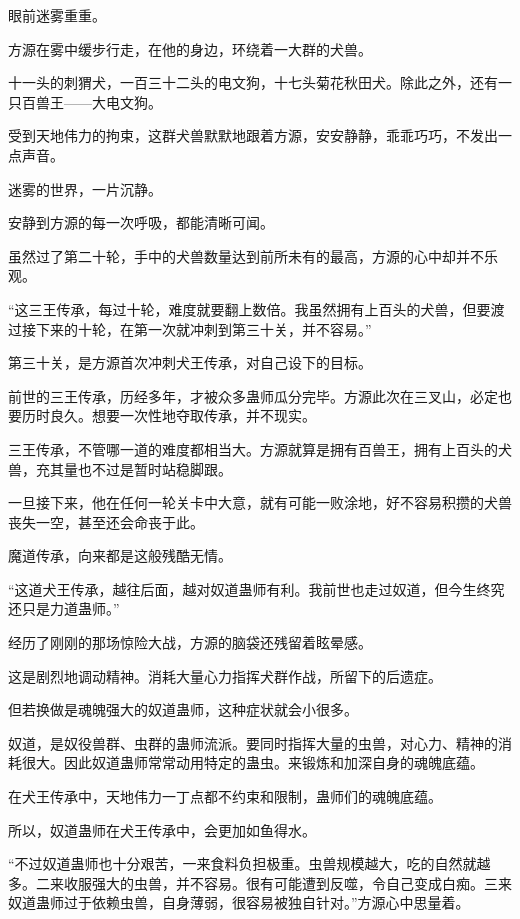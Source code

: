 
\begin{this_body}



眼前迷雾重重。

方源在雾中缓步行走，在他的身边，环绕着一大群的犬兽。

十一头的刺猬犬，一百三十二头的电文狗，十七头菊花秋田犬。除此之外，还有一只百兽王——大电文狗。

受到天地伟力的拘束，这群犬兽默默地跟着方源，安安静静，乖乖巧巧，不发出一点声音。

迷雾的世界，一片沉静。

安静到方源的每一次呼吸，都能清晰可闻。

虽然过了第二十轮，手中的犬兽数量达到前所未有的最高，方源的心中却并不乐观。

“这三王传承，每过十轮，难度就要翻上数倍。我虽然拥有上百头的犬兽，但要渡过接下来的十轮，在第一次就冲刺到第三十关，并不容易。”

第三十关，是方源首次冲刺犬王传承，对自己设下的目标。

前世的三王传承，历经多年，才被众多蛊师瓜分完毕。方源此次在三叉山，必定也要历时良久。想要一次性地夺取传承，并不现实。

三王传承，不管哪一道的难度都相当大。方源就算是拥有百兽王，拥有上百头的犬兽，充其量也不过是暂时站稳脚跟。

一旦接下来，他在任何一轮关卡中大意，就有可能一败涂地，好不容易积攒的犬兽丧失一空，甚至还会命丧于此。

魔道传承，向来都是这般残酷无情。

“这道犬王传承，越往后面，越对奴道蛊师有利。我前世也走过奴道，但今生终究还只是力道蛊师。”

经历了刚刚的那场惊险大战，方源的脑袋还残留着眩晕感。

这是剧烈地调动精神。消耗大量心力指挥犬群作战，所留下的后遗症。

但若换做是魂魄强大的奴道蛊师，这种症状就会小很多。

奴道，是奴役兽群、虫群的蛊师流派。要同时指挥大量的虫兽，对心力、精神的消耗很大。因此奴道蛊师常常动用特定的蛊虫。来锻炼和加深自身的魂魄底蕴。

在犬王传承中，天地伟力一丁点都不约束和限制，蛊师们的魂魄底蕴。

所以，奴道蛊师在犬王传承中，会更加如鱼得水。

“不过奴道蛊师也十分艰苦，一来食料负担极重。虫兽规模越大，吃的自然就越多。二来收服强大的虫兽，并不容易。很有可能遭到反噬，令自己变成白痴。三来奴道蛊师过于依赖虫兽，自身薄弱，很容易被独自针对。”方源心中思量着。


\end{this_body}
